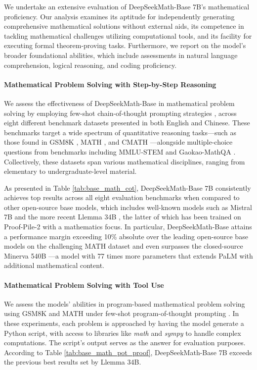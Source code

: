 We undertake an extensive evaluation of DeepSeekMath-Base 7B’s mathematical proficiency. Our analysis examines its aptitude for independently generating comprehensive mathematical solutions without external aids, its competence in tackling mathematical challenges utilizing computational tools, and its facility for executing formal theorem-proving tasks. Furthermore, we report on the model's broader foundational abilities, which include assessments in natural language comprehension, logical reasoning, and coding proficiency.

\paragraph{Mathematical Problem Solving with Step-by-Step Reasoning}

We assess the effectiveness of DeepSeekMath-Base in mathematical problem solving by employing few-shot chain-of-thought prompting strategies \citep{cot}, across eight different benchmark datasets presented in both English and Chinese. These benchmarks target a wide spectrum of quantitative reasoning tasks—such as those found in GSM8K \citep{gsm8k}, MATH \citep{MATH}, and CMATH \citep{wei2023cmath}—alongside multiple-choice questions from benchmarks including MMLU-STEM \citep{mmlu} and Gaokao-MathQA \citep{agieval}. Collectively, these datasets span various mathematical disciplines, ranging from elementary to undergraduate-level material.

As presented in Table \ref{tab:base_math_cot}, DeepSeekMath-Base 7B consistently achieves top results across all eight evaluation benchmarks when compared to other open-source base models, which includes well-known models such as Mistral 7B \citep{mistral} and the more recent Llemma 34B \citep{llemma}, the latter of which has been trained on Proof-Pile-2 \citep{llemma} with a mathematics focus. In particular, DeepSeekMath-Base attains a performance margin exceeding 10\% absolute over the leading open-source base models on the challenging MATH dataset and even surpasses the closed-source Minerva 540B \citep{minerva}—a model with 77 times more parameters that extends PaLM \citep{palm} with additional mathematical content.

\paragraph{Mathematical Problem Solving with Tool Use} We assess the models’ abilities in program-based mathematical problem solving using GSM8K and MATH under few-shot program-of-thought prompting \citep{pot,pal}. In these experiments, each problem is approached by having the model generate a Python script, with access to libraries like \textit{math} and \textit{sympy} to handle complex computations. The script’s output serves as the answer for evaluation purposes. According to Table \ref{tab:base_math_pot_proof}, DeepSeekMath-Base 7B exceeds the previous best results set by Llemma 34B.

